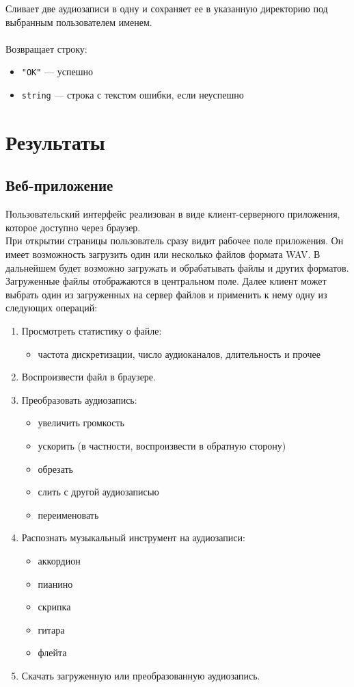 \documentclass[14pt,a4paper]{article}
\begin{document}
\noindent Сливает две аудиозаписи в одну и сохраняет ее в указанную директорию под выбранным пользователем именем. \\\\
Возвращает строку:
\smallskip
\begin{itemize}
\item \lstinline{"OK"} --- успешно
\item \lstinline{string} --- строка с текстом ошибки, если неуспешно
\end{itemize}

\newpage

\section[Результаты]{\huge Результаты}

\subsection{Веб-приложение}

Пользовательский интерфейс реализован в виде клиент-серверного приложения, которое доступно через браузер. \\

При открытии страницы пользователь сразу видит рабочее поле приложения. Он имеет возможность загрузить один или несколько файлов формата WAV. В дальнейшем будет возможно загружать и обрабатывать файлы и других форматов. Загруженные файлы отображаются в центральном поле. Далее клиент может выбрать один из загруженных на сервер файлов и применить к нему одну из следующих операций:
\begin{enumerate}
\item Просмотреть статистику о файле:
    \begin{itemize}
    \item частота дискретизации, число аудиоканалов, длительность и прочее
    \end{itemize}
\item Воспроизвести файл в браузере.
\item Преобразовать аудиозапись:
    \begin{itemize}
    \item увеличить громкость
    \item ускорить (в частности, воспроизвести в обратную сторону)
    \item обрезать
    \item слить с другой аудиозаписью
    \item переименовать
    \end{itemize}
\item Распознать музыкальный инструмент на аудиозаписи:
    \begin{itemize}
    \item аккордион
    \item пианино
    \item скрипка
    \item гитара
    \item флейта
    \end{itemize}
\item Скачать загруженную или преобразованную аудиозапись.
\end{enumerate}
\end{document}
